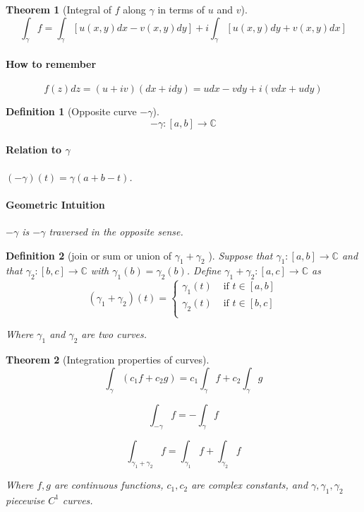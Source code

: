 \documentclass[a4paper]{article}
\newtheorem{definition}{Definition}
\newtheorem{theorem}{Theorem}
\newcommand{\C}{\mathbb{C}}
\begin{document}
\begin{theorem}[Integral of $f$ along $\gamma$ in terms of $u$ and $v$]
  \[
  \int_\gamma f = \int_\gamma [u(x, y) dx - v(x, y)dy] + i \int_\gamma [u(x, y)dy + v(x, y)dx]
  \]
  \paragraph{How to remember}
  \[f(z) dz = (u + iv)(dx + i dy) = u dx - v dy + i(v dx + u dy)\]

\end{theorem}

\begin{definition}[Opposite curve $-\gamma$]
  \[
    - \gamma : [a , b] \to \C
  \]
  \paragraph{Relation to $\gamma$}
  $(- \gamma)(t) = \gamma(a + b - t)$.

  \paragraph{Geometric Intuition}
  $- \gamma $ is $- \gamma$ traversed in the opposite sense. 
\end{definition}

\begin{definition}[join or sum or union of $\gamma_1 + \gamma_2$ ]
  Suppose that $\gamma_1 : [a, b] \to \C$ and that $\gamma_2: [b, c] \to \C$ with $\gamma_1(b) = \gamma_2(b)$. 
  Define $\gamma_1 + \gamma_2 : [a, c] \to \C$ as 
  \[ (\gamma_1 + \gamma_2)(t) = \begin{cases} 
      \gamma_1(t) & \text{ if } t \in [a, b] \\ 
      \gamma_2(t) & \text{ if } t \in [b, c] \\ 
   \end{cases}
\]

  Where $\gamma_1$ and $\gamma_2$ are two curves. 
\end{definition}



\begin{theorem}[Integration properties of curves]
  \[
    \int_\gamma (c_1 f + c_2 g) = c_1 \int_\gamma f + c_2 \int_\gamma g
  \]

  \[
    \int_{-\gamma} f = - \int_\gamma f
  \]

  \[
    \int_{\gamma_1 + \gamma_2} f = \int_{\gamma_1} f + \int_{\gamma_2} f 
  \]

  Where $f, g$ are continuous functions, $c_1, c_2$ are complex constants, and $\gamma, \gamma_1, \gamma_2$ piecewise $C^1$ curves. 
\end{theorem}
\end{document}
